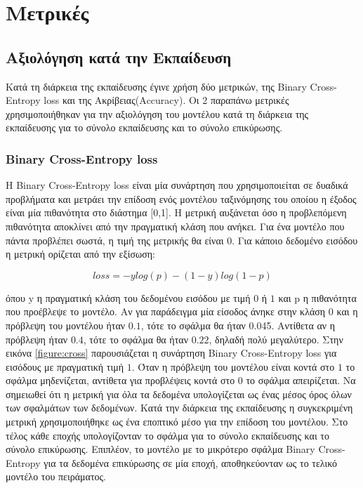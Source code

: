\chapter{ Μετρικές}
\label{chap:6}

\section{Αξιολόγηση κατά την Εκπαίδευση}
\label{sec:6.1}

Κατά τη διάρκεια της εκπαίδευσης έγινε χρήση δύο μετρικών, της Binary Cross-Entropy loss και της Ακρίβειας(Αccuracy). Οι 2 παραπάνω μετρικές χρησιμοποιήθηκαν για την αξιολόγηση του μοντέλου κατά τη διάρκεια της εκπαίδευσης για το σύνολο εκπαίδευσης και το σύνολο επικύρωσης. 

\subsection{Binary Cross-Entropy loss}
\label{subsec:6.1.1}
H Binary Cross-Entropy loss είναι μία συνάρτηση που χρησιμοποιείται σε δυαδικά προβλήματα και μετράει την επίδοση ενός μοντέλου ταξινόμησης του οποίου η έξοδος είναι μία πιθανότητα στο διάστημα [0,1]. Η μετρική αυξάνεται όσο η προβλεπόμενη 
πιθανότητα αποκλίνει από την πραγματική κλάση που ανήκει. Για ένα μοντέλο που πάντα προβλέπει σωστά, η τιμή της μετρικής θα είναι $0$. Για κάποιο δεδομένο εισόδου η μετρική ορίζεται από την εξίσωση:

\begin{equation}
loss = -ylog(p) - (1-y) log(1 -p)
\end{equation}

όπου y η πραγματική κλάση του δεδομένου εισόδου με τιμή $0$ ή $1$ και p η πιθανότητα που προέβλεψε το μοντέλο. Αν για παράδειγμα μία είσοδος άνηκε στην κλάση $0$ και η πρόβλεψη του μοντέλου ήταν $0.1$, τότε το σφάλμα θα ήταν 0.045. Αντίθετα αν η πρόβλεψη ήταν $0.4$, τότε το σφάλμα θα ήταν $0.22$, δηλαδή πολύ μεγαλύτερο. Στην εικόνα \ref{figure:cross} παρουσιάζεται η συνάρτηση Binary Cross-Entropy loss για εισόδους με πραγματική τιμή $1$. Όταν η πρόβλεψη του μοντέλου είναι κοντά στο $1$ το σφάλμα μηδενίζεται, αντίθετα για προβλέψεις κοντά στο $0$ το σφάλμα απειρίζεται. Να σημειωθεί ότι η μετρική για όλα τα δεδομένα υπολογίζεται ως ένας μέσος όρος όλων των σφαλμάτων των δεδομένων. Κατά την διάρκεια της εκπαίδευσης η συγκεκριμένη μετρική χρησιμοποιήθηκε ως ένα εποπτικό μέσο για την επίδοση του μοντέλου. Στο τέλος κάθε εποχής υπολογίζονταν το σφάλμα  για το σύνολο εκπαίδευσης και το σύνολο επικύρωσης. Επιπλέον, το μοντέλο με το μικρότερο σφάλμα Binary Cross-Entropy για τα δεδομένα επικύρωσης σε μία εποχή, αποθηκεύονταν ως το τελικό μοντέλο του πειράματος. 

